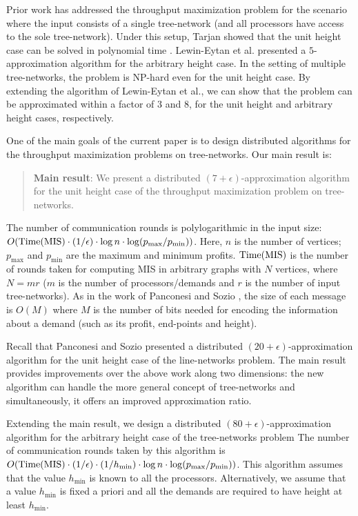 \documentclass[11pt]{article}
\newcommand{\TMIS} {{\rm Time(MIS)}}
\begin{document}
Prior work has addressed the throughput maximization problem for the scenario where
the input consists of a single tree-network (and all processors have access to the sole tree-network).
Under this setup, Tarjan showed that the unit height case can be solved in polynomial time \cite{Tarjan}.
Lewin-Eytan et al. \cite{Lewin-Eytan} presented a $5$-approximation algorithm for the arbitrary height case.
In the setting of multiple tree-networks, the problem is NP-hard even for the unit height case.
By extending the algorithm of Lewin-Eytan et al., we can show that the problem 
can be approximated within a factor of $3$ and $8$, for the unit height and arbitrary height cases, respectively.

One of the main goals of the current paper is to design distributed algorithms
for the throughput maximization problems on tree-networks. 
Our main result is:
\begin{quote}
{\bf Main result}: We present a distributed $(7+\epsilon)$-approximation algorithm for the unit height case of the 
throughput maximization problem on tree-networks. 
\end{quote}
The number of communication rounds is polylogarithmic in the input size:
$O(\TMIS \cdot (1/\epsilon) \cdot \log n \cdot \log(p_{\max}/p_{\min}))$.
Here, $n$ is the number of vertices;
$p_{\max}$ and $p_{\min}$ are the maximum and minimum profits.
$\TMIS$ is the number of rounds taken for computing MIS in arbitrary graphs with $N$ vertices,
where $N=mr$ ($m$ is the number of processors/demands and $r$ is the number of input tree-networks).
As in the work of Panconesi and Sozio \cite{Pancj}, the size of each message is
$O(M)$ where $M$ is the number of bits needed for encoding the information about a demand 
(such as its profit, end-points and height).

Recall that Panconesi and Sozio \cite{Pancj} presented a 
distributed $(20+\epsilon)$-approximation algorithm for the unit height case of the line-networks problem. 
The main result provides improvements over the above work along two dimensions:
the new algorithm can handle the more general concept of tree-networks and simultaneously, it
offers an improved approximation ratio. 

Extending the main result, we design a distributed $(80+\epsilon)$-approximation algorithm for  the
arbitrary height case of the tree-networks problem
The number of communication rounds taken by this algorithm is
$O(\TMIS \cdot (1/\epsilon) \cdot (1/h_{\min}) \cdot \log n \cdot \log(p_{\max}/p_{\min}))$.
This algorithm assumes that the value $h_{\min}$ is known to all the processors.
Alternatively, we assume that a value $h_{\min}$ is fixed a priori
and all the demands are required to have height at least $h_{\min}$.
\end{document}
